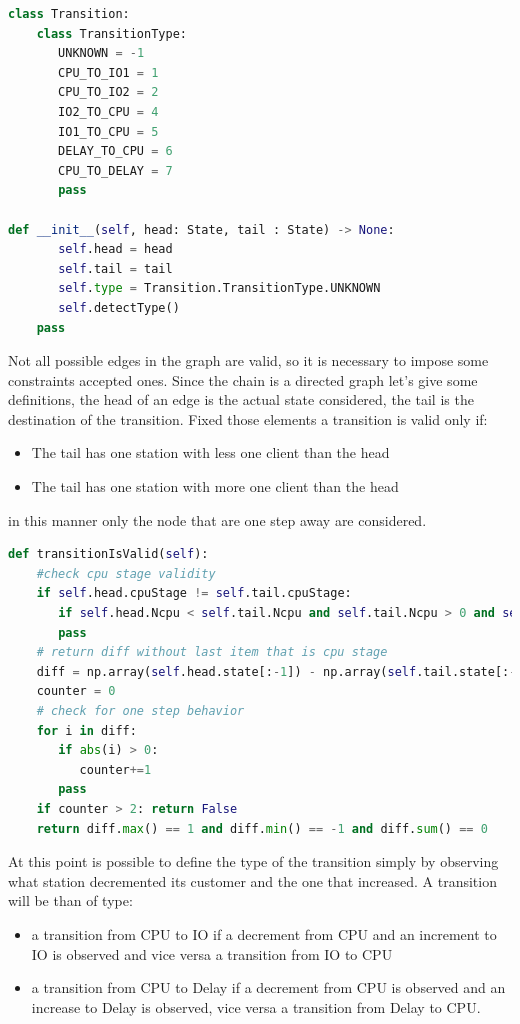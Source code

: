 \documentclass[12pt,a4paper]{article}
\begin{document}
\begin{lstlisting}[language=python]
class Transition:   
    class TransitionType:
       UNKNOWN = -1
       CPU_TO_IO1 = 1
       CPU_TO_IO2 = 2
       IO2_TO_CPU = 4
       IO1_TO_CPU = 5
       DELAY_TO_CPU = 6
       CPU_TO_DELAY = 7
       pass

def __init__(self, head: State, tail : State) -> None:
       self.head = head
       self.tail = tail
       self.type = Transition.TransitionType.UNKNOWN
       self.detectType()
    pass
\end{lstlisting}

\pagebreak

Not all possible edges in the graph are valid, so it is necessary to impose some constraints accepted ones. Since the chain is a directed graph let's give some definitions, the head of an edge is the actual state considered, the tail is the destination of the transition. Fixed those elements a transition is valid only if:


\begin{itemize}
    \item The tail has one station with less one client than the head 
    \item The tail has one station with more one client than the head 
\end{itemize}
in this manner only the node that are one step away are considered. 

\begin{lstlisting}[language=python,breaklines]
    def transitionIsValid(self):
    #check cpu stage validity
    if self.head.cpuStage != self.tail.cpuStage:
       if self.head.Ncpu < self.tail.Ncpu and self.tail.Ncpu > 0 and self.head.Ncpu > 0: return False
       pass
    # return diff without last item that is cpu stage
    diff = np.array(self.head.state[:-1]) - np.array(self.tail.state[:-1])
    counter = 0
    # check for one step behavior
    for i in diff:
       if abs(i) > 0:
          counter+=1
       pass
    if counter > 2: return False
    return diff.max() == 1 and diff.min() == -1 and diff.sum() == 0 
\end{lstlisting}

At this point is possible to define the type of the transition simply by observing what station decremented its customer and the one that increased. A transition will be than of type: 

\begin{itemize}
    \item a transition from CPU to IO if a decrement from CPU and an increment to IO is observed and vice versa a transition from IO to CPU 
    \item a transition from CPU to Delay if a decrement from CPU is observed and an increase to Delay is observed, vice versa a transition from Delay to CPU.
\end{itemize}
\end{document}
